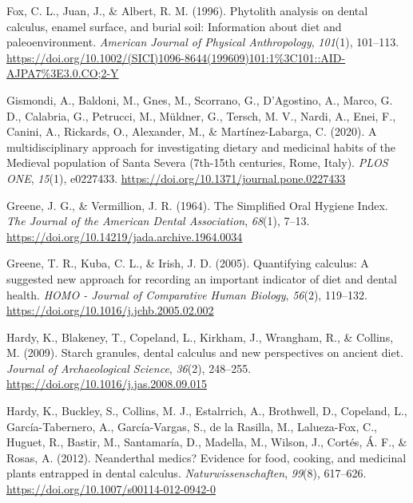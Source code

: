 \documentclass[
  b5paper,
]{book}
\newlength{\cslhangindent}
\newlength{\cslentryspacingunit} %
\newenvironment{CSLReferences}[2] %
 {%
  \setlength{\parindent}{0pt}
  \ifodd #1
  \let\oldpar\par
  \def\par{\hangindent=\cslhangindent\oldpar}
  \fi
  \setlength{\parskip}{#2\cslentryspacingunit}
 }%
 {}
\begin{document}
\begin{CSLReferences}{1}{0}
\leavevmode{}%
Fox, C. L., Juan, J., \& Albert, R. M. (1996). Phytolith analysis on
dental calculus, enamel surface, and burial soil: {Information} about
diet and paleoenvironment. \emph{American Journal of Physical
Anthropology}, \emph{101}(1), 101--113.
\url{https://doi.org/10.1002/(SICI)1096-8644(199609)101:1\%3C101::AID-AJPA7\%3E3.0.CO;2-Y}

\leavevmode{}%
Gismondi, A., Baldoni, M., Gnes, M., Scorrano, G., D'Agostino, A.,
Marco, G. D., Calabria, G., Petrucci, M., Müldner, G., Tersch, M. V.,
Nardi, A., Enei, F., Canini, A., Rickards, O., Alexander, M., \&
Martínez-Labarga, C. (2020). A multidisciplinary approach for
investigating dietary and medicinal habits of the {Medieval} population
of {Santa Severa} (7th-15th centuries, {Rome}, {Italy}). \emph{PLOS
ONE}, \emph{15}(1), e0227433.
\url{https://doi.org/10.1371/journal.pone.0227433}

\leavevmode{}%
Greene, J. G., \& Vermillion, J. R. (1964). The {Simplified Oral Hygiene
Index}. \emph{The Journal of the American Dental Association},
\emph{68}(1), 7--13.
\url{https://doi.org/10.14219/jada.archive.1964.0034}

\leavevmode{}%
Greene, T. R., Kuba, C. L., \& Irish, J. D. (2005). Quantifying
calculus: {A} suggested new approach for recording an important
indicator of diet and dental health. \emph{HOMO - Journal of Comparative
Human Biology}, \emph{56}(2), 119--132.
\url{https://doi.org/10.1016/j.jchb.2005.02.002}

\leavevmode{}%
Hardy, K., Blakeney, T., Copeland, L., Kirkham, J., Wrangham, R., \&
Collins, M. (2009). Starch granules, dental calculus and new
perspectives on ancient diet. \emph{Journal of Archaeological Science},
\emph{36}(2), 248--255. \url{https://doi.org/10.1016/j.jas.2008.09.015}

\leavevmode{}%
Hardy, K., Buckley, S., Collins, M. J., Estalrrich, A., Brothwell, D.,
Copeland, L., García-Tabernero, A., García-Vargas, S., de la Rasilla,
M., Lalueza-Fox, C., Huguet, R., Bastir, M., Santamaría, D., Madella,
M., Wilson, J., Cortés, Á. F., \& Rosas, A. (2012). Neanderthal medics?
{Evidence} for food, cooking, and medicinal plants entrapped in dental
calculus. \emph{Naturwissenschaften}, \emph{99}(8), 617--626.
\url{https://doi.org/10.1007/s00114-012-0942-0}


\end{CSLReferences}
\end{document}
